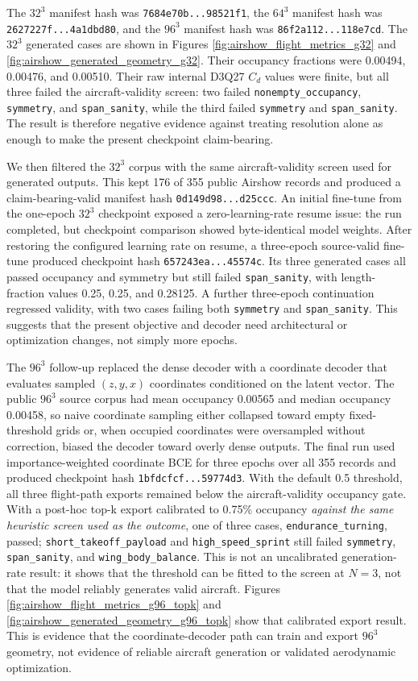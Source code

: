 The \(32^3\) manifest hash was \texttt{7684e70b...98521f1}, the \(64^3\) manifest hash was \texttt{2627227f...4a1dbd80}, and the \(96^3\) manifest hash was \texttt{86f2a112...118e7cd}. The \(32^3\) generated cases are shown in Figures \ref{fig:airshow_flight_metrics_g32} and \ref{fig:airshow_generated_geometry_g32}. Their occupancy fractions were 0.00494, 0.00476, and 0.00510. Their raw internal D3Q27 \(C_d\) values were finite, but all three failed the aircraft-validity screen: two failed \texttt{nonempty\_occupancy}, \texttt{symmetry}, and \texttt{span\_sanity}, while the third failed \texttt{symmetry} and \texttt{span\_sanity}. The result is therefore negative evidence against treating resolution alone as enough to make the present checkpoint claim-bearing.

We then filtered the \(32^3\) corpus with the same aircraft-validity screen used for generated outputs. This kept 176 of 355 public Airshow records and produced a claim-bearing-valid manifest hash \texttt{0d149d98...d25ccc}. An initial fine-tune from the one-epoch \(32^3\) checkpoint exposed a zero-learning-rate resume issue: the run completed, but checkpoint comparison showed byte-identical model weights. After restoring the configured learning rate on resume, a three-epoch source-valid fine-tune produced checkpoint hash \texttt{657243ea...45574c}. Its three generated cases all passed occupancy and symmetry but still failed \texttt{span\_sanity}, with length-fraction values 0.25, 0.25, and 0.28125. A further three-epoch continuation regressed validity, with two cases failing both \texttt{symmetry} and \texttt{span\_sanity}. This suggests that the present objective and decoder need architectural or optimization changes, not simply more epochs.

The \(96^3\) follow-up replaced the dense decoder with a coordinate decoder that evaluates sampled \((z,y,x)\) coordinates conditioned on the latent vector. The public \(96^3\) source corpus had mean occupancy 0.00565 and median occupancy 0.00458, so naive coordinate sampling either collapsed toward empty fixed-threshold grids or, when occupied coordinates were oversampled without correction, biased the decoder toward overly dense outputs. The final run used importance-weighted coordinate BCE for three epochs over all 355 records and produced checkpoint hash \texttt{1bfdcfcf...59774d3}. With the default 0.5 threshold, all three flight-path exports remained below the aircraft-validity occupancy gate. With a post-hoc top-k export calibrated to 0.75\% occupancy \emph{against the same heuristic screen used as the outcome}, one of three cases, \texttt{endurance\_turning}, passed; \texttt{short\_takeoff\_payload} and \texttt{high\_speed\_sprint} still failed \texttt{symmetry}, \texttt{span\_sanity}, and \texttt{wing\_body\_balance}. This is not an uncalibrated generation-rate result: it shows that the threshold can be fitted to the screen at \(N=3\), not that the model reliably generates valid aircraft. Figures \ref{fig:airshow_flight_metrics_g96_topk} and \ref{fig:airshow_generated_geometry_g96_topk} show that calibrated export result. This is evidence that the coordinate-decoder path can train and export \(96^3\) geometry, not evidence of reliable aircraft generation or validated aerodynamic optimization.

